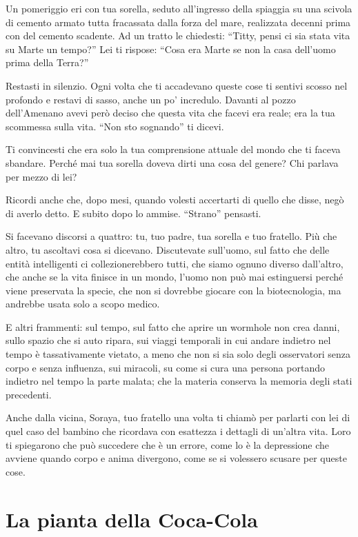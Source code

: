 Un pomeriggio eri con tua sorella, seduto all'ingresso della spiaggia su una scivola di cemento armato tutta fracassata dalla forza del mare, realizzata decenni prima con del cemento scadente. Ad un tratto le chiedesti: “Titty, pensi ci sia stata vita su Marte un tempo?” Lei ti rispose: “Cosa era Marte se non la casa dell'uomo prima della Terra?”

Restasti in silenzio. Ogni volta che ti accadevano queste cose ti sentivi scosso nel profondo e restavi di sasso, anche un po' incredulo. Davanti al pozzo dell'Amenano avevi però deciso che questa vita che facevi era reale; era la tua scommessa sulla vita. “Non sto sognando” ti dicevi.

Ti convincesti che era solo la tua comprensione attuale del mondo che ti faceva sbandare. Perché mai tua sorella doveva dirti una cosa del genere? Chi parlava per mezzo di lei?

Ricordi anche che, dopo mesi, quando volesti accertarti di quello che disse, negò di averlo detto. E subito dopo lo ammise. “Strano” pensasti.

Si facevano discorsi a quattro: tu, tuo padre, tua sorella e tuo fratello. Più che altro, tu ascoltavi cosa si dicevano. Discutevate sull'uomo, sul fatto che delle entità intelligenti ci collezionerebbero tutti, che siamo ognuno diverso dall'altro, che anche se la vita finisce in un mondo, l'uomo non può mai estinguersi perché viene preservata la specie, che non si dovrebbe giocare con la biotecnologia, ma andrebbe usata solo a scopo medico.

E altri frammenti: sul tempo, sul fatto che aprire un wormhole non crea danni, sullo spazio che si auto ripara, sui viaggi temporali in cui andare indietro nel tempo è tassativamente vietato, a meno che non si sia solo degli osservatori senza corpo e senza influenza, sui miracoli, su come si cura una persona portando indietro nel tempo la parte malata; che la materia conserva la memoria degli stati precedenti.

Anche dalla vicina, Soraya, tuo fratello una volta ti chiamò per parlarti con lei di quel caso del bambino che ricordava con esattezza i dettagli di un'altra vita. Loro ti spiegarono che può succedere che è un errore, come lo è la depressione che avviene quando corpo e anima divergono, come se si volessero scusare per queste cose.%

\section{La pianta della Coca-Cola}
\label{pianta_della_coca_cola}

